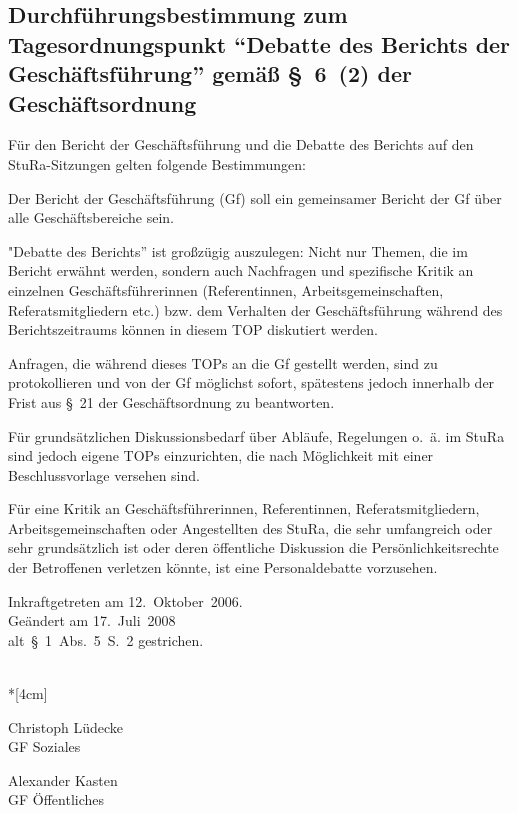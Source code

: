 \setcounter{section}{0} %
\begin{multicols}{2}


\section{Durchführungsbestimmung zum Tagesordnungspunkt "`Debatte des Berichts der Geschäftsführung"' gemäß §~6~(2) der Geschäftsordnung}

Für den Bericht der Geschäftsführung und die Debatte des Berichts auf den StuRa-Sitzungen gelten folgende Bestimmungen:

\setcounter{absatz}{0}

\Abs \Satz Der Bericht der Geschäftsführung (Gf) soll ein gemeinsamer Bericht der Gf über alle Geschäftsbereiche sein.

\Abs \Satz "Debatte des Berichts” ist großzügig auszulegen: \Satz Nicht nur Themen, die im Bericht erwähnt werden, sondern auch Nachfragen und spezifische Kritik an einzelnen Geschäftsführerinnen (Referentinnen, Arbeitsgemeinschaften, Referatsmitgliedern etc.) bzw. dem Verhalten der Geschäftsführung während des Berichtszeitraums können in diesem TOP diskutiert werden.

\Abs \Satz Anfragen, die während dieses TOPs an die Gf gestellt werden, sind zu protokollieren und von der Gf möglichst sofort, spätestens jedoch innerhalb der Frist aus §~21 der Geschäftsordnung zu beantworten.

\Abs \Satz Für grundsätzlichen Diskussionsbedarf über Abläufe, Regelungen o.~ä. im StuRa sind jedoch eigene TOPs einzurichten, die nach Möglichkeit mit einer Beschlussvorlage versehen sind.

\Abs \Satz Für eine Kritik an Geschäftsführerinnen, Referentinnen, Referatsmitgliedern, Arbeitsgemeinschaften oder Angestellten des StuRa, die sehr umfangreich oder sehr grundsätzlich ist oder deren öffentliche Diskussion die Persönlichkeitsrechte der Betroffenen verletzen könnte, ist eine Personaldebatte vorzusehen.

\end{multicols}

\nopagebreak
\vspace{1cm}
Inkraftgetreten am 12.~Oktober~2006.
\\


\footnotesize
Geändert am 17.~Juli~2008\\
alt~§~1~Abs.~5~S.~2 gestrichen.


\normalsize
~\\*[4cm]
\begin{center}
\hspace*{\fill}
\parbox{7cm}{Christoph Lüdecke\\GF Soziales}
\hfill\parbox{7cm}{Alexander Kasten\\GF Öffentliches}
\hspace*{\fill}
\end{center}